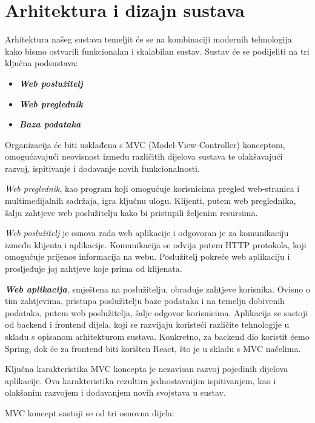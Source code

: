 \chapter{Arhitektura i dizajn sustava}
		
	
	Arhitektura našeg sustava temeljit će se na kombinaciji modernih tehnologija kako bismo ostvarili funkcionalan i skalabilan sustav. Sustav će se podijeliti na tri ključna podsustava: 
	\begin{itemize}
		\item 	\textit{\textbf{Web poslužitelj}}		
		\item 	\textit{\textbf{Web preglednik}}	
		\item 	\textit{\textbf{Baza podataka}}
	\end{itemize}
	Organizacija će biti usklađena s MVC (Model-View-Controller) konceptom, omogućavajući neovisnost između različitih dijelova sustava te olakšavajući razvoj, ispitivanje i dodavanje novih funkcionalnosti.
	
	\textit{Web preglednik}, kao program koji omogućuje korisnicima pregled web-stranica i multimedijalnih sadržaja, igra ključnu ulogu. Klijenti, putem web preglednika, šalju zahtjeve web poslužitelju kako bi pristupili željenim resursima.
	
	\textit{Web poslužitelj} je osnova rada web aplikacije i odgovoran je za komunikaciju između klijenta i aplikacije. Komunikacija se odvija putem HTTP protokola, koji omogućuje prijenos informacija na webu. Poslužitelj pokreće web aplikaciju i prosljeđuje joj zahtjeve koje prima od klijenata.	

	\textit{\textbf{Web aplikacija}}, smještena na poslužitelju, obrađuje zahtjeve korisnika. Ovisno o tim zahtjevima, pristupa poslužitelju baze podataka i na temelju dobivenih podataka, putem web poslužitelja, šalje odgovor korisnicima. Aplikacija se sastoji od backend i frontend dijela, koji se razvijaju koristeći različite tehnologije u skladu s opisanom arhitekturom sustava. Konkretno, za backend dio koristit ćemo Spring, dok će za frontend biti korišten React, što je u skladu s MVC načelima.
		
	Ključna karakteristika MVC koncepta je nezavisan razvoj pojedinih dijelova aplikacije. Ova karakteristika rezultira jednostavnijim ispitivanjem, kao i olakšanim razvojem i dodavanjem novih svojstava u sustav.
	
	MVC koncept sastoji se od tri osnovna dijela:
	
